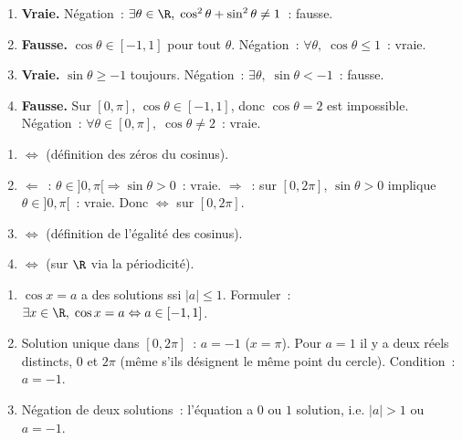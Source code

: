 
\begin{enumerate}
  \item \textbf{Vraie.} N\'egation~: $\exists\theta\in\R,\;\cos^2\theta+\sin^2\theta\ne1$~: fausse.
  \item \textbf{Fausse.} $\cos\theta\in[-1,1]$ pour tout $\theta$. N\'egation~:
        $\forall\theta,\;\cos\theta\leq1$~: vraie.
  \item \textbf{Vraie.} $\sin\theta\geq-1$ toujours. N\'egation~: $\exists\theta,\;\sin\theta<-1$~: fausse.
  \item \textbf{Fausse.} Sur $[0,\pi]$, $\cos\theta\in[-1,1]$, donc $\cos\theta=2$ est impossible.
        N\'egation~: $\forall\theta\in[0,\pi],\;\cos\theta\ne2$~: vraie.
\end{enumerate}


\begin{enumerate}
  \item $\Leftrightarrow$ (d\'efinition des z\'eros du cosinus).
  \item $\Leftarrow$~: $\theta\in]0,\pi[\Rightarrow\sin\theta>0$~: vraie.
        $\Rightarrow$~: sur $[0,2\pi]$, $\sin\theta>0$ implique $\theta\in]0,\pi[$~: vraie.
        Donc $\Leftrightarrow$ sur $[0,2\pi]$.
  \item $\Leftrightarrow$ (d\'efinition de l'\'egalit\'e des cosinus).
  \item $\Leftrightarrow$ (sur $\R$ via la p\'eriodicit\'e).
\end{enumerate}


\begin{enumerate}
  \item $\cos x=a$ a des solutions ssi $|a|\leq1$.
        Formuler~: $\exists x\in\R,\;\cos x=a\Leftrightarrow a\in[-1,1]$.
  \item Solution unique dans $[0,2\pi]$~: $a=-1$ ($x=\pi$). Pour $a=1$ il y a deux r\'eels distincts, $0$ et $2\pi$
        (m\^eme s'ils d\'esignent le m\^eme point du cercle). Condition~: $a=-1$.
  \item N\'egation de \og deux solutions\fg~:
        l'\'equation a $0$ ou $1$ solution, i.e. $|a|>1$ ou $a=-1$.
\end{enumerate}

